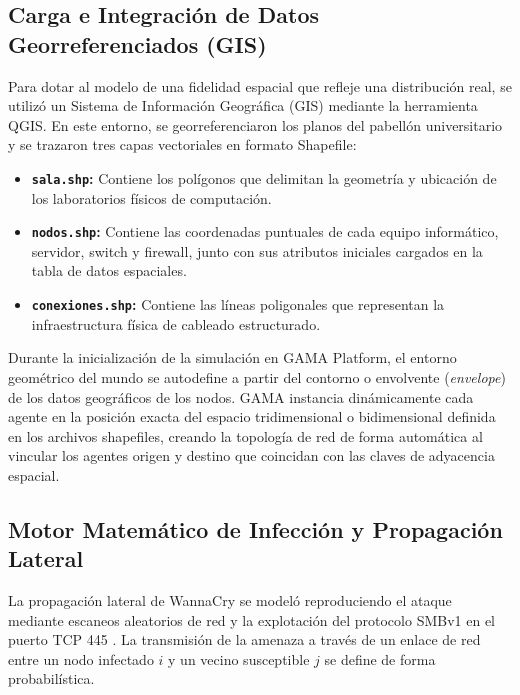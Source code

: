 \subsection{Carga e Integración de Datos Georreferenciados (GIS)}
Para dotar al modelo de una fidelidad espacial que refleje una distribución real, se utilizó un Sistema de Información Geográfica (GIS) mediante la herramienta QGIS. En este entorno, se georreferenciaron los planos del pabellón universitario y se trazaron tres capas vectoriales en formato Shapefile:
\begin{itemize}
    \item \textbf{\texttt{sala.shp}:} Contiene los polígonos que delimitan la geometría y ubicación de los laboratorios físicos de computación.
    \item \textbf{\texttt{nodos.shp}:} Contiene las coordenadas puntuales de cada equipo informático, servidor, switch y firewall, junto con sus atributos iniciales cargados en la tabla de datos espaciales.
    \item \textbf{\texttt{conexiones.shp}:} Contiene las líneas poligonales que representan la infraestructura física de cableado estructurado.
\end{itemize}

Durante la inicialización de la simulación en GAMA Platform, el entorno geométrico del mundo se autodefine a partir del contorno o envolvente (\textit{envelope}) de los datos geográficos de los nodos. GAMA instancia dinámicamente cada agente en la posición exacta del espacio tridimensional o bidimensional definida en los archivos shapefiles, creando la topología de red de forma automática al vincular los agentes origen y destino que coincidan con las claves de adyacencia espacial.

\subsection{Motor Matemático de Infección y Propagación Lateral}
La propagación lateral de WannaCry se modeló reproduciendo el ataque mediante escaneos aleatorios de red y la explotación del protocolo SMBv1 en el puerto TCP 445 \cite{enisa2017wannacry}. La transmisión de la amenaza a través de un enlace de red entre un nodo infectado $i$ y un vecino susceptible $j$ se define de forma probabilística.


